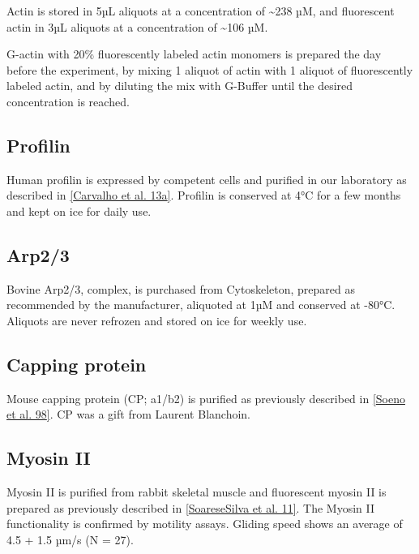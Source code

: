 \documentclass[A4paperpaper,11pt,english]{sphinxmanual}
\begin{document}
Actin is stored in 5µL aliquots at a concentration of \textasciitilde{}238 µM, and
fluorescent actin in 3µL aliquots at a concentration of \textasciitilde{}106 µM.

G-actin with 20\% fluorescently labeled actin monomers is prepared the day before
the experiment, by mixing 1 aliquot of actin with 1 aliquot of fluorescently
labeled actin, and by diluting the mix with G-Buffer until the desired concentration is reached.


\subsection{Profilin}
\label{parts/part2:profilin}
Human profilin is expressed by competent cells and purified in our laboratory as
described in {\hyperref[parts/part2:carvalho2013a]{{[}Carvalho et al. 13a{]}}}.  Profilin is conserved at 4°C for a few months and
kept on ice for daily use.


\subsection{Arp2/3}
\label{parts/part2:arp2-3}
Bovine Arp2/3, complex, is purchased from Cytoskeleton, prepared as recommended by the manufacturer, aliquoted at 1µM
and conserved at -80°C.  Aliquots are never refrozen and stored on ice for
weekly use.


\subsection{Capping protein}
\label{parts/part2:capping-protein}
Mouse capping protein (CP; a1/b2) is purified as previously described in {\hyperref[parts/part2:soeno1998]{{[}Soeno et al. 98{]}}}. CP was a gift from Laurent Blanchoin.


\subsection{Myosin II}
\label{parts/part2:myosin-ii}
Myosin II is purified from rabbit skeletal muscle and fluorescent myosin II is
prepared as previously described in {\hyperref[parts/part2:soaresesilva2011]{{[}SoareseSilva et al. 11{]}}}. The Myosin II functionality
is confirmed by motility assays. Gliding speed shows an average of 4.5
+ 1.5 µm/s (N = 27).
\end{document}
